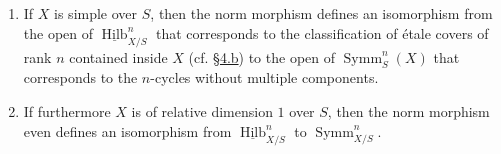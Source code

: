   
 \begin{enumerate}
    
 \item[a.]
      If \(X\) is simple over \(S\), then the norm morphism defines an isomorphism from the open of \(\underline {\operatorname {Hilb}}_{X/S}^n\) that corresponds to the classification of étale covers of rank \(n\) contained inside \(X\) (cf. \hyperref[fga3.iv-4]{§4.b}) to the open of \(\operatorname {Symm}_S^n(X)\) that corresponds to the \(n\)-cycles without multiple components.
    


    
 \item[b.]
      If furthermore \(X\) is of relative dimension \(1\) over \(S\), then the norm morphism even defines an isomorphism from \(\underline {\operatorname {Hilb}}_{X/S}^n\) to \(\operatorname {Symm}_{X/S}^n\).
    

  \end{enumerate}


